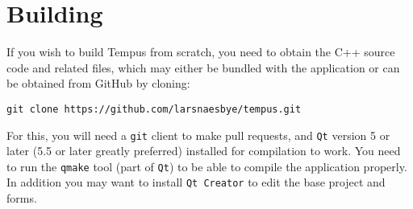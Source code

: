 \section{Building}

If you wish to build Tempus from scratch, you need to obtain the C++ source code and related files, which may either be bundled with the application or can be obtained from GitHub by cloning:

\texttt{git clone https://github.com/larsnaesbye/tempus.git}

For this, you will need a \texttt{git} client to make pull requests, and \texttt{Qt} version 5 or later (5.5 or later greatly preferred) installed for compilation to work. 
You need to run the \texttt{qmake} tool (part of \texttt{Qt}) to be able to compile the application properly. In addition you may want to install \texttt{Qt Creator} to edit the base project and forms.

